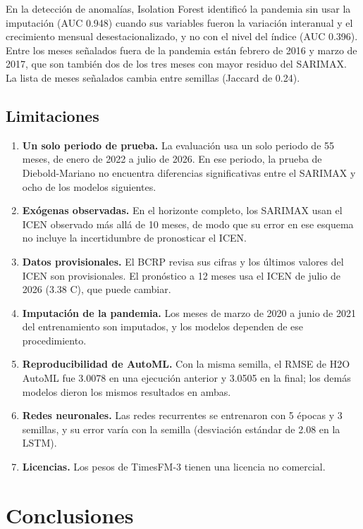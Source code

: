 \documentclass[conference]{IEEEtran}
\begin{document}
En la detección de anomalías, Isolation Forest identificó la pandemia sin usar la imputación (AUC 0.948) cuando sus variables fueron la variación interanual y el crecimiento mensual desestacionalizado, y no con el nivel del índice (AUC 0.396). Entre los meses señalados fuera de la pandemia están febrero de 2016 y marzo de 2017, que son también dos de los tres meses con mayor residuo del SARIMAX. La lista de meses señalados cambia entre semillas (Jaccard de 0.24).

\subsection{Limitaciones}

\begin{enumerate}[leftmargin=1.3em,itemsep=1pt]
  \item \textbf{Un solo periodo de prueba.} La evaluación usa un solo periodo de 55 meses, de enero de 2022 a julio de 2026. En ese periodo, la prueba de Diebold-Mariano no encuentra diferencias significativas entre el SARIMAX y ocho de los modelos siguientes.
  \item \textbf{Exógenas observadas.} En el horizonte completo, los SARIMAX usan el ICEN observado más allá de 10 meses, de modo que su error en ese esquema no incluye la incertidumbre de pronosticar el ICEN.
  \item \textbf{Datos provisionales.} El BCRP revisa sus cifras y los últimos valores del ICEN son provisionales. El pronóstico a 12 meses usa el ICEN de julio de 2026 (3.38 \textdegree C), que puede cambiar.
  \item \textbf{Imputación de la pandemia.} Los meses de marzo de 2020 a junio de 2021 del entrenamiento son imputados, y los modelos dependen de ese procedimiento.
  \item \textbf{Reproducibilidad de AutoML.} Con la misma semilla, el RMSE de H2O AutoML fue 3.0078 en una ejecución anterior y 3.0505 en la final; los demás modelos dieron los mismos resultados en ambas.
  \item \textbf{Redes neuronales.} Las redes recurrentes se entrenaron con 5 épocas y 3 semillas, y su error varía con la semilla (desviación estándar de 2.08 en la LSTM).
  \item \textbf{Licencias.} Los pesos de TimesFM-3 tienen una licencia no comercial.
\end{enumerate}

\section{Conclusiones}
\end{document}
